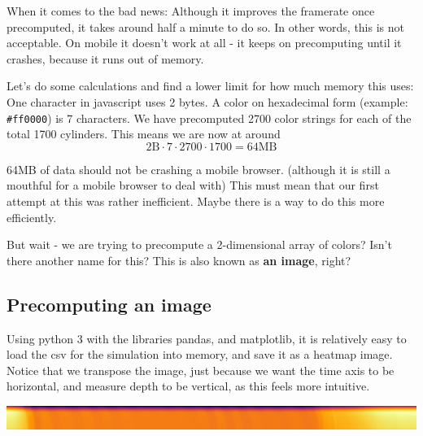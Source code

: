 When it comes to the bad news: Although it improves the framerate once
precomputed, it takes around half a minute to do so. In other words,
this is not acceptable. On mobile it doesn't work at all - it keeps on
precomputing until it crashes, because it runs out of memory.

Let's do some calculations and find a lower limit for how much memory
this uses: One character in javascript uses 2 bytes. A color on
hexadecimal form (example:
\texttt{\textquotesingle{}\#ff0000\textquotesingle{}}) is 7 characters.
We have precomputed 2700 color strings for each of the total 1700
cylinders. This means we are now at around
\[2\text{B}\cdot7\cdot2700\cdot1700=64\text{MB}\]

64MB of data should not be crashing a mobile browser. (although it is
still a mouthful for a mobile browser to deal with) This must mean that
our first attempt at this was rather inefficient. Maybe there is a way
to do this more efficiently.

But wait - we are trying to precompute a 2-dimensional array of colors?
Isn't there another name for this? This is also known as \textbf{an
image}, right?

\hypertarget{precomputing-an-image}{%
\subsection{Precomputing an image}\label{precomputing-an-image}}

Using python 3 with the libraries pandas, and matplotlib, it is
relatively easy to load the csv for the simulation into memory, and save
it as a heatmap image. Notice that we transpose the image, just because
we want the time axis to be horizontal, and measure depth to be
vertical, as this feels more intuitive.

\begin{Shaded}
\begin{Highlighting}[]
\OperatorTok{=}\OperatorTok{=}\NormalTok{)}
\end{Highlighting}
\end{Shaded}

\includegraphics{pipepressure-1.png}

